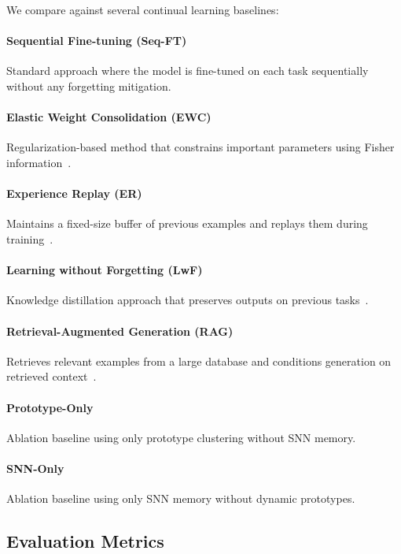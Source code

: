 \documentclass{article}
\begin{document}
We compare against several continual learning baselines:

\paragraph{Sequential Fine-tuning (Seq-FT)} Standard approach where the model is fine-tuned on each task sequentially without any forgetting mitigation.

\paragraph{Elastic Weight Consolidation (EWC)} Regularization-based method that constrains important parameters using Fisher information~\cite{kirkpatrick2017overcoming}.

\paragraph{Experience Replay (ER)} Maintains a fixed-size buffer of previous examples and replays them during training~\cite{rolnick2019experience}.

\paragraph{Learning without Forgetting (LwF)} Knowledge distillation approach that preserves outputs on previous tasks~\cite{li2017learning}.

\paragraph{Retrieval-Augmented Generation (RAG)} Retrieves relevant examples from a large database and conditions generation on retrieved context~\cite{lewis2020retrieval}.

\paragraph{Prototype-Only} Ablation baseline using only prototype clustering without SNN memory.

\paragraph{SNN-Only} Ablation baseline using only SNN memory without dynamic prototypes.

\subsection{Evaluation Metrics}
\end{document}

